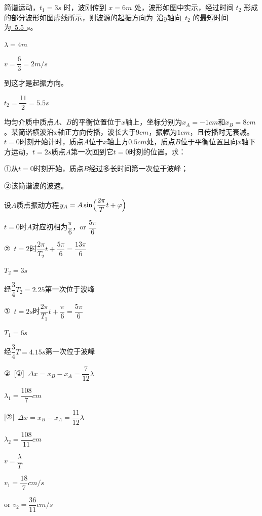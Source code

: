 \begin{problem}
简谐运动，$t_1=3\unit{s}$ 时，波刚传到 $x=6\unit{m}$ 处，波形如图中实示，经过时间 $t_2$ 形成的部分波形如图虚线所示，则波源的起振方向为\underline{\ 沿$y$轴向\ }$t_2$ 的最短时间为\underline{\ 5.5\ }s。 %

\begin{solution}
$\lambda=4\unit{m}$

$v=\dfrac{6}{3}=2\unit{m/s}$

到这才是起振方向。 %

$t_2=\dfrac{11}{2}=5.5\unit{s}$
\end{solution}
\end{problem}

\begin{problem}[10分]
均匀介质中质点$A$、$B$的平衡位置位于$x$轴上，坐标分别为$x_A=-1\unit{cm}$和$x_B=8\unit{cm}$。某简谐横波沿$x$轴正方向传播，波长大于$9\unit{cm}$，振幅为$1\unit{cm}$，且传播时无衰减。$t=0$时刻开始计时，质点$A$位于$x$轴上方$0.5\unit{cm}$处，质点$B$位于平衡位置且向$x$轴下方运动，$t=2\unit{s}$质点$A$第一次回到它$t=0$时刻的位置。求：

①从$t=0$时刻开始，质点$B$经过多长时间第一次位于波峰；

②该简谐波的波速。
\begin{solution}
设$A$质点振动方程\quad $y_A=A\sin\Bigl(\dfrac{2\pi}{T}t+\varphi\Bigr)$

$t=0$时$A$对应初相为$\dfrac{\pi}{6}$，or $\dfrac{5\pi}{6}$

②\ $t=2$时\quad $\dfrac{2\pi}{T_2}t+\dfrac{5\pi}{6}=\dfrac{13\pi}{6}$

$T_2=3\unit{s}$

经$\dfrac{3}{4}T_2=2.25$第一次位于波峰

①\ $t=2\unit{s}$时\quad $\dfrac{2\pi}{T_1}t+\dfrac{\pi}{6}=\dfrac{5\pi}{6}$

$T_1=6\unit{s}$

经$\dfrac{3}{4}T=4.15\unit{s}$第一次位于波峰%

②\ [①]\ $\Delta x=x_B-x_A=\dfrac{7}{12}\lambda$

$\lambda_1=\dfrac{108}{7}\unit{cm}$

[②]\ $\Delta x=x_B-x_A=\dfrac{11}{12}\lambda$

$\lambda_2=\dfrac{108}{11}\unit{cm}$

$v=\dfrac{\lambda}{T}$

$v_1=\dfrac{18}{7}\unit{cm/s}$

or $v_2=\dfrac{36}{11}\unit{cm/s}$
\end{solution}
\end{problem}


